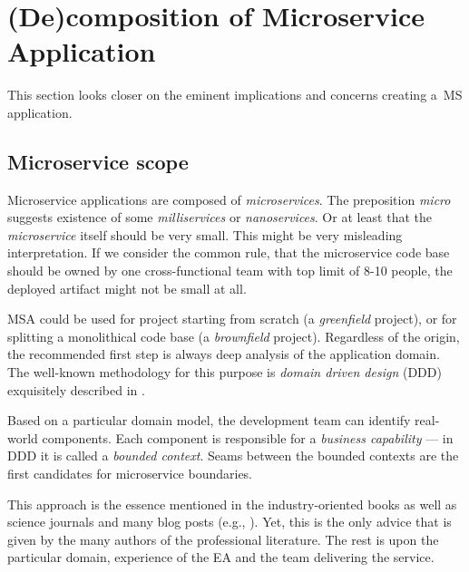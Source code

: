 \documentclass[thesis=M,english,hidelinks]{FITthesis}[2012/10/20]
\begin{document}
\section{(De)composition of Microservice Application}

This section looks closer on the eminent implications and concerns creating a~\acrlong{MS} application.

\subsection{Microservice scope}
Microservice applications are composed of \textit{microservices}. The preposition \textit{micro} suggests existence of some \textit{milliservices} or \textit{nanoservices}. Or at least that the \textit{microservice} itself should be very small. This might be very misleading interpretation. If we consider the common rule, that the microservice code base should be owned by one cross-functional team \cite{ms-building-ms, ms-evolutionary-arch, ms-fow-new-term-def} with top limit of 8-10 people, the deployed artifact might not be small at all.

\acrshort{MSA} could be used for project starting from scratch (a \textit{greenfield} project), or for splitting a monolithical code base (a \textit{brownfield} project). Regardless of the origin, the recommended first step is always deep analysis of the application domain. The well-known methodology for this purpose is \textit{domain driven design} (\acrshort{DDD}) exquisitely described in \cite{domain-driven-design}.

Based on a particular domain model, the development team can identify real-world components. Each component is responsible for a \textit{business capability} --- in \acrshort{DDD} it is called a \textit{bounded context}. Seams between the bounded contexts are the first candidates for microservice boundaries.

This approach is the essence mentioned in the industry-oriented books \cite{ms-building-ms, ms-evolutionary-arch, ms-patterns, ms-ca} as well as science journals \cite{ms-integrating-with-adaptable-ea, ms-towards-integrated-soa, ms-design-tradeoffs, ms-approaches-to-soa-evolution, ms-self-managing} and many blog posts (e.g., \cite{ms-fow-new-term-def, ms-modelling-with-petter}). Yet, this is the only advice that is given by the many authors of the professional literature. The rest is upon the particular domain, experience of the \acrlong{EA} and the team delivering the service. 
\end{document}

